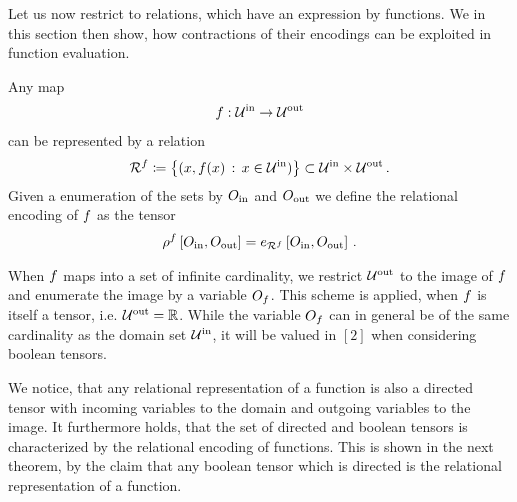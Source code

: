 
Let us now restrict to relations, which have an expression by functions.
We in this section then show, how contractions of their encodings can be exploited in function evaluation.



\begin{definition}\label{def:functionRelationEncoding}
	Any map
	\begin{align*}
		f : \mathcal{U}^{\mathrm{in}} \rightarrow \mathcal{U}^{\mathrm{out}}
	\end{align*}
	can be represented by a relation
	\begin{align*}
		\mathcal{R}^{f} \coloneqq \left\{ (x,f(x) \, : \, x \in\mathcal{U}^{\mathrm{in}} )\right\} \subset \mathcal{U}^{\mathrm{in}} \times \mathcal{U}^{\mathrm{out}} \, .
	\end{align*}
	Given a enumeration of the sets by $O_{\mathrm{in}}$ and $O_{\mathrm{out}}$ we define the relational encoding of $f$ as the tensor
	\begin{align*}
		\rho^{f}\left[O_{\mathrm{in}},O_{\mathrm{out}}\right]
		= e_{\mathcal{R}^{f}}\left[O_{\mathrm{in}},O_{\mathrm{out}}\right]  \, .
	\end{align*}
\end{definition}

\begin{remark}
	When $f$ maps into a set of infinite cardinality, we restrict $\mathcal{U}^{\mathrm{out}}$ to the image of $f$ and enumerate the image by a variable $O_{f}$.
	This scheme is applied, when $f$ is itself a tensor, i.e. $\mathcal{U}^{\mathrm{out}}=\mathbb{R}$.
	While the variable $O_{f}$ can in general be of the same cardinality as the domain set $\mathcal{U}^{\mathrm{in}}$, it will be valued in $[2]$ when considering boolean tensors.
\end{remark}

We notice, that any relational representation of a function is also a directed tensor with incoming variables to the domain and outgoing variables to the image.
It furthermore holds, that the set of directed and boolean tensors is characterized by the relational encoding of functions.
This is shown in the next theorem, by the claim that any boolean tensor which is directed is the relational representation of a function.

